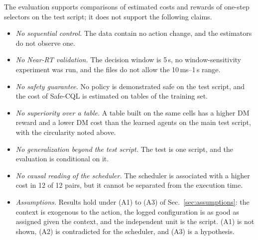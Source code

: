 The evaluation supports comparisons of estimated costs and rewards of one-step selectors on the test script; it does not support the following claims.%
\begin{itemize}
  \item \emph{No sequential control.} The data contain no action change, and the estimators do not observe one.%
  \item \emph{No Near-RT validation.} The decision window is 5\,s, no window-sensitivity experiment was run, and the files do not allow the 10\,ms--1\,s range.%
  \item \emph{No safety guarantee.} No policy is demonstrated safe on the test script, and the cost of Safe-CQL is estimated on tables of the training set.%
  \item \emph{No superiority over a table.} A table built on the same cells has a higher DM reward and a lower DM cost than the learned agents on the main test script, with the circularity noted above.%
  \item \emph{No generalization beyond the test script.} The test is one script, and the evaluation is conditional on it.%
  \item \emph{No causal reading of the scheduler.} The scheduler is associated with a higher cost in 12 of 12 pairs, but it cannot be separated from the execution time.%
  \item \emph{Assumptions.} Results hold under (A1) to (A3) of Sec.~\ref{sec:assumptions}: the context is exogenous to the action, the logged configuration is as good as assigned given the context, and the independent unit is the script. (A1) is not shown, (A2) is contradicted for the scheduler, and (A3) is a hypothesis.%
\end{itemize}
